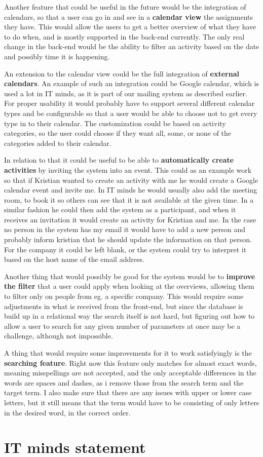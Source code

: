 Another feature that could be useful in the future would be the integration of
calendars, so that a user can go in and see in a \textbf{calendar view} the assignments
they have. This would allow the users to get a better overview of what they have
to do when, and is mostly supported in the back-end currently. The only real
change in the back-end would be the ability to filter an activity based on the
date and possibly time it is happening.

An extension to the calendar view could be the full integration of \textbf{external
calendars}. An example of such an integration could be Google calendar, which is
used a lot in IT minds, as it is part of our mailing system as described
earlier. For proper usability it would probably have to support several
different calendar types and be configurable so that a user would be able to
choose not to get every type in to their calendar. The customization could be
based on activity categories, so the user could choose if they want all, some,
or none of the categories added to their calendar.

In relation to that it could be useful to be able to \textbf{automatically create
activities} by inviting the system into an event. This could as an example work
so that if Kristian wanted to create an activity with me he would create a
Google calendar event and invite me. In IT minds he would usually also add the
meeting room, to book it so others can see that it is not available at the given
time. In a similar fashion he could then add the system as a participant, and
when it receives an invitation it would create an activity for Kristian and me.
In the case no person in the system has my email it would have to add a new
person and probably inform kristian that he should update the information on
that person. For the company it could be left blank, or the system could try to
interpret it based on the host name of the email address.

Another thing that would possibly be good for the system would  be to \textbf{improve
the filter} that a user could apply when looking at the overviews, allowing them
to filter only on people from eg. a specific company. This would require some
adjustments in what is received from the front-end, but since the database is
build up in a relational way the search itself is not hard, but figuring out how
to allow a user to search for any given number of parameters at once may be a
challenge, although not impossible.

A thing that would require some improvements for it to work satisfyingly is the
\textbf{searching feature}. Right now this feature only matches for almost exact words,
meaning misspellings are not accepted, and the only acceptable differences in
the words are spaces and dashes, as i remove those from the search term and the
target term. I also make sure that there are any issues with upper or lower case
letters, but it still means that the term would have to be consisting of only
letters in the desired word, in the correct order.

\section{IT minds statement}
